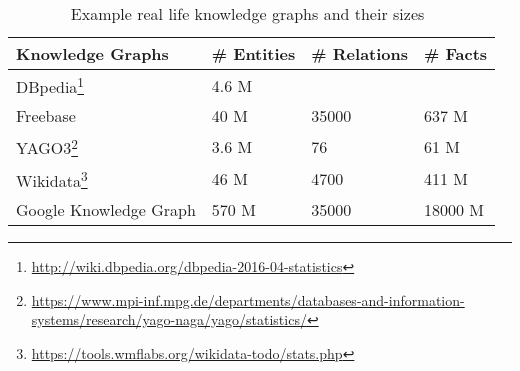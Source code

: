 \begin{table}[t]
\centering


\begin{tabular}{@{}llll@{}}
\toprule
Knowledge Graphs       & \# Entities & \# Relations & \# Facts \\ \midrule
DBpedia\footnote{\url{http://wiki.dbpedia.org/dbpedia-2016-04-statistics}}                
					   &      4.6 M  &              &          \\
Freebase			   &     40 M    &      35000   &    637 M \\
YAGO3\footnote{\url{https://www.mpi-inf.mpg.de/departments/databases-and-information-systems/research/yago-naga/yago/statistics/}}                  &      3.6 M   &       76   &   61 M  \\
Wikidata\footnote{\url{https://tools.wmflabs.org/wikidata-todo/stats.php}}       &      46 M   &       4700   &   411 M  \\
Google Knowledge Graph &      570 M  &       35000  &   18000 M\\ \bottomrule
\end{tabular}
\caption{Example real life knowledge graphs and their sizes~\cite{Nickel2015ARO}}
\label{tab:kgs}

\end{table}